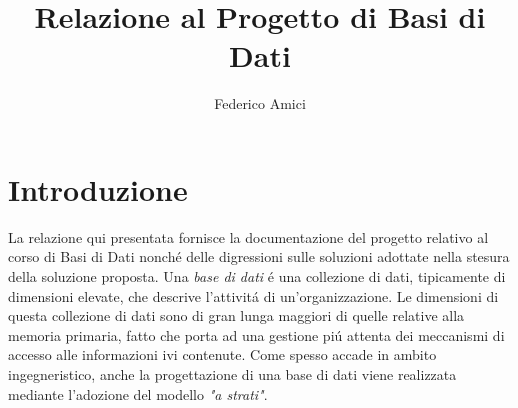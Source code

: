 \documentclass[12pt,a4paper,onecolumn,x11names]{article}
\title{Relazione al Progetto di Basi di Dati}
\author{Federico Amici}
\begin{document}
\maketitle
\newpage
\tableofcontents
\listoftables
\newpage



\section{Introduzione}
	\begin{flushleft}
		La relazione qui presentata fornisce la documentazione del progetto relativo al corso di Basi di Dati nonch\'{e} delle digressioni sulle soluzioni adottate nella stesura della soluzione proposta.
		Una \textit{base di dati} \'{e} una collezione di dati, tipicamente di dimensioni elevate, che descrive l'attivit\'{a} di un'organizzazione. Le dimensioni di questa collezione di dati sono di gran lunga maggiori di quelle relative alla memoria primaria, fatto che porta ad una gestione pi\'{u} attenta dei meccanismi di accesso alle informazioni ivi contenute.\newline
		Come spesso accade in ambito ingegneristico, anche la progettazione di una base di dati viene realizzata mediante l'adozione del modello \textit{"a strati"}. \newline
	\end{flushleft}
	
	\begin{center}
		\end{center}
\end{document}

